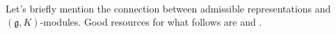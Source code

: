 


\noindent\\ Let's briefly mention the connection between admissible representations and $(\mathfrak{g}, K)$-modules. Good resources for what follows are \cite{Vog81} and \cite{Bin10}.\\

